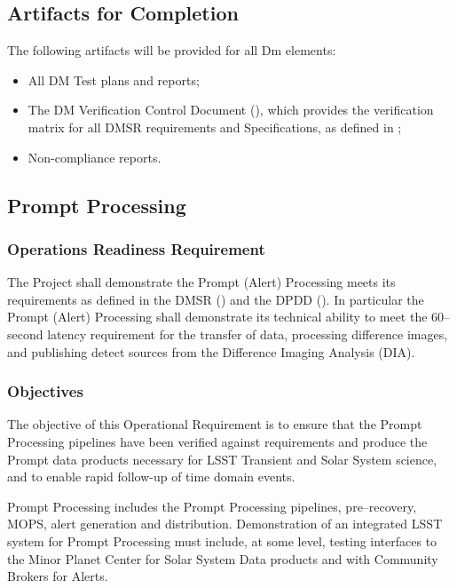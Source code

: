 \subsection{Artifacts for Completion}

The following artifacts will be provided for all Dm elements:

\begin{itemize}
	\item All DM Test plans and reports;
	\item The DM Verification Control Document (), which provides the verification matrix for all DMSR requirements and Specifications, as defined in ;
	\item Non-compliance reports.
\end{itemize}


\subsection{Prompt Processing}

\subsubsection{Operations Readiness Requirement}
The Project shall demonstrate the Prompt (Alert) Processing meets its requirements as defined in the DMSR () and the DPDD ().  In particular the Prompt (Alert) Processing shall demonstrate its technical ability to meet the 60--second latency requirement for the transfer of data, processing difference images, and publishing detect sources from the Difference Imaging Analysis (DIA).

\subsubsection{Objectives} 

The objective of this Operational Requirement is to ensure that the Prompt Processing pipelines have been verified against requirements and produce the Prompt data products necessary for LSST Transient and Solar System science, and to enable rapid follow-up of time domain events. 

Prompt Processing includes the Prompt Processing pipelines, pre--recovery, MOPS, alert generation and distribution. Demonstration of an integrated LSST system for Prompt Processing must include, at some level, testing interfaces to the Minor Planet Center for Solar System Data products and with Community Brokers for Alerts. 

